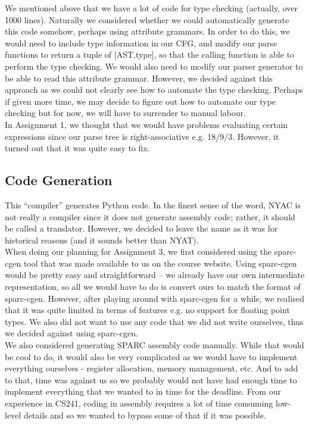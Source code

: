 \documentclass[onecolumn,11pt]{article}
\begin{document}
We mentioned above that we have a lot of code for type checking (actually, over 1000 lines). Naturally we considered whether we could automatically generate this code somehow, perhaps using attribute grammars. In order to do this, we would need to include type information in our CFG, and modify our parse functions to return a tuple of [AST,type], so that the calling function is able to perform the type checking. We would also need to modify our parser generator to be able to read this attribute grammar. However, we decided against this approach as we could not clearly see how to automate the type checking. Perhaps if given more time, we may decide to figure out how to automate our type checking but for now, we will have to surrender to manual labour. \\

In Assignment 1, we thought that we would have problems evaluating certain expressions since our parse tree is right-associative e.g. 18/9/3. However, it turned out that it was quite easy to fix. \\

\subsection{Code Generation}
This ``compiler'' generates Python code. In the finest sense of the word, NYAC is not really a compiler since it does not generate assembly code; rather, it should be called a translator. However, we decided to leave the name as it was for historical reasons (and it sounds better than NYAT). \\

When doing our planning for Assignment 3, we first considered using the sparc-cgen tool that was made available to us on the course website. Using sparc-cgen would be pretty easy and straightforward -- we already have our own intermediate representation, so all we would have to do is convert ours to match the format of sparc-cgen. However, after playing around with sparc-cgen for a while, we realised that it was quite limited in terms of features e.g. no support for floating point types. We also did not want to use any code that we did not write ourselves, thus we decided against using sparc-cgen. \\

We also considered generating SPARC assembly code manually. While that would be cool to do, it would also be very complicated as we would have to implement everything ourselves - register allocation, memory management, etc. And to add to that, time was against us so we probably would not have had enough time to implement everything that we wanted to in time for the deadline. From our experience in CS241, coding in assembly requires a lot of time consuming low-level details and so we wanted to bypass some of that if it was possible. \\
\end{document}
